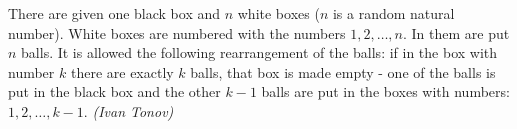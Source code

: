 There are given one black box and $n$ white boxes ($n$ is a random natural number). White boxes are numbered with the numbers $1,2,\ldots,n$. In them are put $n$ balls. It is allowed the following rearrangement of the balls: if in the box with number $k$ there are exactly $k$ balls, that box is made empty - one of the balls is put in the black box and the other $k-1$ balls are put in the boxes with numbers: $1,2,\ldots,k-1$. \textit{(Ivan Tonov)}